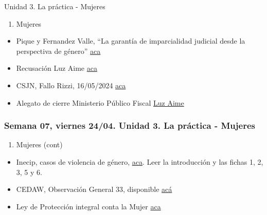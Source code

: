 \documentclass[
]{article}
\providecommand{\tightlist}{%
  \setlength{\itemsep}{0pt}\setlength{\parskip}{0pt}}
\begin{document}
Unidad 3. La práctica - Mujeres

\begin{enumerate}
\def\labelenumi{\alph{enumi}.}
\setcounter{enumi}{4}
\tightlist
\item
  Mujeres
\end{enumerate}

\begin{itemize}
\item
  Pique y Fernandez Valle, ``La garantía de imparcialidad judicial desde
  la perspectiva de género''
  \href{https://drive.google.com/file/d/1atsNG8fNfxcBruDPtPve0N3AmUf6OA3h/view?usp=sharing}{aca}
\item
  Recusación Luz Aime
  \href{https://drive.google.com/file/d/1ZWe1xva3x_Y0ttVg2CZ4eliKBj-8bbBy/preview}{aca}
\item
  CSJN, Fallo Rizzi, 16/05/2024
  \href{https://drive.google.com/file/d/1W6zEuSV0_wshgD8vEc_1HMRiGjlUa-qS/view?usp=sharing}{aca}
\item
  Alegato de cierre Ministerio Público Fiscal
  \href{https://youtu.be/ZKH82JYVLgc}{Luz Aime}
\end{itemize}

\subsubsection{Semana 07, viernes 24/04. Unidad 3. La práctica -
Mujeres}\label{semana-07-viernes-2404.-unidad-3.-la-pruxe1ctica---mujeres}

\begin{enumerate}
\def\labelenumi{\alph{enumi}.}
\setcounter{enumi}{4}
\tightlist
\item
  Mujeres (cont)
\end{enumerate}

\begin{itemize}
\item
  Inecip, casos de violencia de género,
  \href{https://inecip.org/publicaciones/herramientas-jurisprudenciales-para-el-litigio-con-perspectiva-de-genero/}{aca}.
  Leer la introducción y las fichas 1, 2, 3, 5 y 6.
\item
  CEDAW, Observación General 33, disponible
  \href{https://drive.google.com/file/d/1j3suY4Q3JhS5EzbAvs6_K6XSbQsOQ7D7/view?usp=sharing}{acá}
\item
  Ley de Protección integral conta la Mujer
  \href{http://servicios.infoleg.gob.ar/infolegInternet/anexos/150000-154999/152155/texact.htm}{aca}
\end{itemize}
\end{document}
